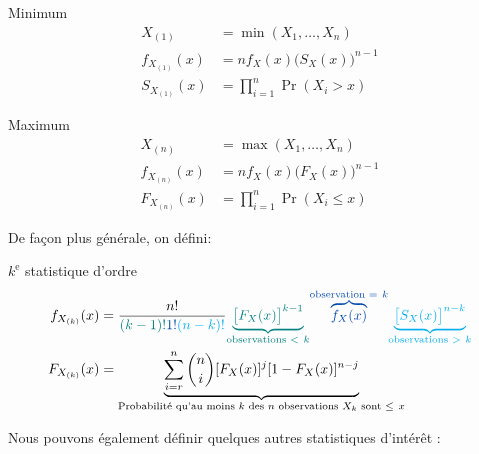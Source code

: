 \documentclass[10pt, french]{article}
\begin{document}
\begin{multicols*}{2}
\setlength{\mathindent}{-0.75cm}
\begin{minipage}{0.5\columnwidth}
\begin{algo}{Minimum}
\begin{align*}
	X_{(1)}
	&=	\min(X_{1}, \dots, X_{n})	\\
	f_{X_{(1)}}(x)
	&=	n f_{X}(x) \big( S_{X}(x) \big)^{n - 1}	\\
	S_{X_{(1)}}(x)
	&=	\prod_{i = 1}^{n} \Pr(X_{i} > x)
\end{align*}
\end{algo}
\end{minipage}
\begin{minipage}{0.5\columnwidth}
\begin{algo}{Maximum}
\begin{align*}
	X_{(n)}
	&=	\max(X_{1}, \dots, X_{n})	\\
	f_{X_{(n)}}(x)
	&=	n f_{X}(x) \big( F_{X}(x) \big)^{n - 1}	\\
	F_{X_{(n)}}(x)
	&=	\prod_{i = 1}^{n} \Pr(X_{i} \le x)
\end{align*}
\end{algo}
\end{minipage}
\setlength{\mathindent}{1cm}

De façon plus générale, on défini:
\begin{algo}{$k^{\text{e}}$ statistique d'ordre}
\begin{align*}
	f_{X_{(k)}}(x)
	&=	\frac{n!}{\textcolor{teal}{(k - 1)!} \textcolor{cobalt}{1!} \textcolor{cyan}{(n - k)!}} \textcolor{teal}{\underset{\text{observations } < \ k}{\underbrace{\big[ F_{X}(x) \big]^{k - 1}}}} \textcolor{cobalt}{\overset{\text{observation } = \ k}{\overbrace{f_{X}(x)}}} \textcolor{cyan}{\underset{\text{observations } > \ k}{\underbrace{\big[ S_{X}(x) \big]^{n - k}}}} \\
	F_{X_{(k)}}(x)
	&=	\underset{\text{Probabilité qu'au moins } k \text{ des } n \text{ observations } X_{k} \text{ sont } \le \ x}{\underbrace{\sum_{i = r}^{n} \binom{n}{i} [F_{X}(x)]^{j} [1 - F_{X}(x)]^{n - j}}}
\end{align*}
\end{algo}

Nous pouvons également définir quelques autres statistiques d'intérêt :


\end{multicols*}
\end{document}
